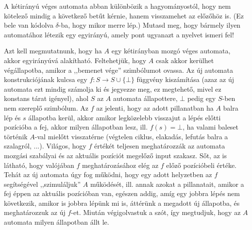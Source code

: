 \begin{Exercise}[counter={sorszam}, difficulty=1]\label{2DFA}
	A kétirányú véges automata abban különbözik a hagyományostól, hogy nem kötelező mindig a következ\H o bet\H ut kérnie, hanem visszamehet az előzőhöz is. (Ez bele van kódolva $\delta$-ba, hogy mikor merre lép.) Mutasd meg, hogy bármely ilyen automatához létezik egy egyirányú, amely pont ugyanazt a nyelvet ismeri fel!
\end{Exercise}	
\begin{Answer}
	Azt kell megmutatnunk, hogy ha $A$ egy kétirányban mozgó véges automata, akkor egyirányúvá alakítható. Feltehetjük, hogy $A$ csak akkor kerülhet végállapotba, amikor a ,,bemenet vége'' szimbólumot ovassa.
	Az új automata konstrukciójának kulcsa egy $f: S \rightarrow S\cup \{\bot\}$ függvény kiszámítása (azaz az új automata ezt mindig számolja ki és jegyezze meg, ez megtehető, mivel ez konstans tárat igényel), ahol $S$ az $A$ automata
	állapottere, $\bot$ pedig egy $S$-ben nem szereplő szimbólum. Az $f$ az
	jelenti, hogy az adott pillanatban ha $A$ balra lép és $s$ állapotba
	kerül, akkor amikor legközelebb visszajut a lépés előtti pozícióba a fej,
	akkor milyen állapotban lesz, ill. $f(s)=\bot$, ha valami baleset történik $A$-val mielőtt visszatérne (végtelen ciklus, elakadás, lefutás balra a
	szalagról, ...). Világos, hogy $f$ értékét teljesen
	meghatározzák az automata mozgási szabályai és az aktuális pozíciót megelőző
	input szakasz. Sőt, az is látható, hogy valójában $f$ meghatározásához elég
	az $f$ előző pozícióbeli értéke. Tehát az új automata úgy fog működni, hogy
	egy adott helyzetben az $f$ segítségével ,,szimuláljuk'' $A$
	működését, ill. annak azokat a pillanatait, amikor a fej éppen az aktuális
	pozícióban van, egészen addig, amíg egy jobbra lépés nem következik, amikor
	is jobbra lépünk mi is, áttérünk a megadott új állapotba, és meghatározzuk az új
	$f$-et. Miután végigolvastuk a szót, így megtudjuk, hogy az $A$ automata milyen állapotban állt le.
\end{Answer}

